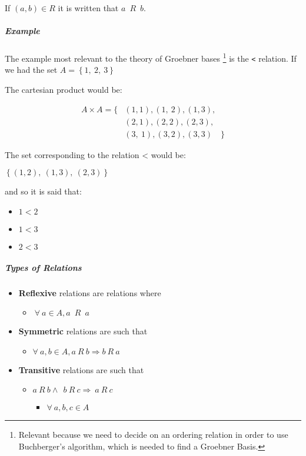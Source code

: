 \documentclass[a4paper,11pt,twoside]{article}
\begin{document}
If \((a,b)\in R\) it is written that \(a\enspace R \enspace b\).
\subparagraph{Example}
\label{sec:orgd695abd}
The example most relevant to the theory of Groebner bases \footnote{Relevant because we need to decide on an ordering relation in
order to use Buchberger's algorithm, which is needed to find a
Groebner Basis.} is
the \texttt{<} relation. If we had the set \(A = \left\{ 1,\ 2,\ 3 \right\}\)

The cartesian product would be:

  \begin{align*}
A\times A=\Bigg\{	&\left(1,1\right),\left(1,\ 2\right),\left(1,3\right), \\
			&\left(2,1\right),\left(2,2\right),\left(2,3\right), \\
			&\left(3,\
1\right),\left(3,2\right),\left(3,3\right)\quad\Bigg\}
\end{align*}

The set corresponding to the relation < would be:

\(\left\{ \left( 1,2 \right),\ \left( 1,3 \right),\ \left( 2,3 \right) \right\}\)

and so it is said that:

\begin{itemize}
\item \(1<2\)
\item \(1<3\)
\item \(2<3\)
\end{itemize}

\subparagraph{Types of Relations}
\label{sec:org9b5f150}

\begin{itemize}
\item \textbf{Reflexive} relations are relations where
\begin{itemize}
\item \(\ \forall\ a \in A, a\enspace R \enspace a\)
\end{itemize}
\item \textbf{Symmetric} relations are such that
\begin{itemize}
\item \(\forall\ a,b \in A, a\ R\ b \Rightarrow b\ R\ a\)
\end{itemize}
\item \textbf{Transitive} relations are such that
\begin{itemize}
\item \(a\ R\ b \land \ \ b\ R\ c \Rightarrow \ a\ R\ c\)
\begin{itemize}
\item \(\forall\ a,b,c \in A\)
\end{itemize}
\end{itemize}
\end{itemize}
\end{document}
